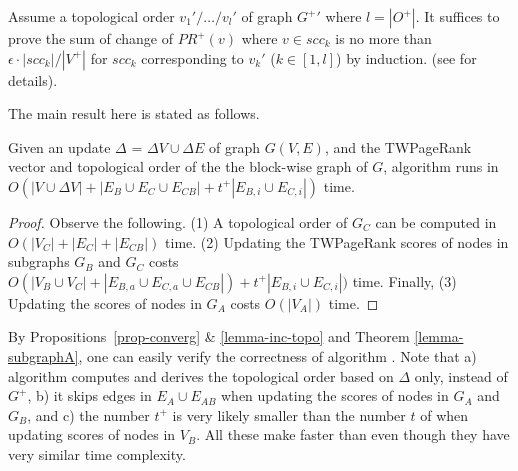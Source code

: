 \begin{proofSketch}
Assume a topological order $v_1'/\dots/v_{l}'$ of graph $G^+{'}$ where $l=|O^+|$. It suffices to prove the sum of change of $PR^+(v)$ where $v\in scc_k$ is no more than $\epsilon\cdot |scc_k|/|V^+|$ for $scc_k$ corresponding to $v_k'$ ($k\in [1,l]$) by induction.
(see \cite{SARank-full} for details).
\end{proofSketch}


The main result here is stated as follows.


\begin{prop} \label{lemma-inc-citation-comp}
Given an update $\Delta$ = $\Delta V\cup\Delta E$ of graph $G(V,E)$, and the TWPageRank vector and topological order of the  the
block-wise graph of $G$, algorithm \inctwprscc runs in $O(|V\cup \Delta V|+|E_B\cup E_C\cup E_{CB}|+t^+|E_{B,i}\cup E_{C,i}|)$ time.
\end{prop}

\begin{proof}
Observe the following. (1) A topological order of $G_C$ can be computed in $O(|V_C|+|E_C|+|E_{CB}|)$ time.
(2) Updating the TWPageRank scores of nodes in subgraphs $G_B$ and $G_C$ costs $O(|V_B\cup V_C|+|E_{B,a}\cup E_{C,a}\cup E_{CB}|)+t^+|E_{B,i}\cup E_{C,i}|)$ time. Finally, (3) Updating the scores of nodes in $G_A$ costs $O(|V_A|)$ time.
\end{proof}


By Propositions~\ref{prop-converg} \& \ref{lemma-inc-topo} and Theorem \ref{lemma-subgraphA}, one can easily verify the correctness of algorithm \inctwprscc.
%
Note that  a) algorithm \inctwprscc computes \sccs and derives the topological order based  on $\Delta$ only, instead of $G^{+}$,
b) it skips edges in $E_A\cup E_{AB}$ when updating the scores of nodes in $G_A$ and $G_B$, and
c) the number $t^+$ is very likely smaller than the number $t$ of \twprscc when updating scores of nodes in $V_B$.
%
All these make \inctwprscc faster than \twprscc even though they have very similar time complexity.


